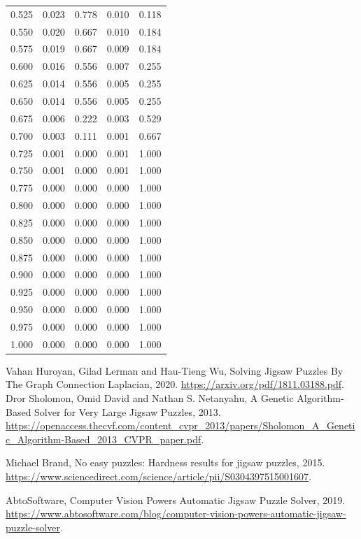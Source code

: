 \documentclass{article}
\begin{document}
\begin{table}[]
\begin{tabular}{
  >{\columncolor[HTML]{FFE599}}c 
  >{\columncolor[HTML]{B6D7A8}}c 
  >{\columncolor[HTML]{9FC5E8}}c 
  >{\columncolor[HTML]{F9CB9C}}c 
  >{\columncolor[HTML]{D9D2E9}}c }
  0.525 & 0.023 & 0.778 & 0.010 & 0.118 \\
  0.550 & 0.020 & 0.667 & 0.010 & 0.184 \\
  0.575 & 0.019 & 0.667 & 0.009 & 0.184 \\
  0.600 & 0.016 & 0.556 & 0.007 & 0.255 \\
  0.625 & 0.014 & 0.556 & 0.005 & 0.255 \\
  0.650 & 0.014 & 0.556 & 0.005 & 0.255 \\
  0.675 & 0.006 & 0.222 & 0.003 & 0.529 \\
  0.700 & 0.003 & 0.111 & 0.001 & 0.667 \\
  0.725 & 0.001 & 0.000 & 0.001 & 1.000 \\
  0.750 & 0.001 & 0.000 & 0.001 & 1.000 \\
  0.775 & 0.000 & 0.000 & 0.000 & 1.000 \\
  0.800 & 0.000 & 0.000 & 0.000 & 1.000 \\
  0.825 & 0.000 & 0.000 & 0.000 & 1.000 \\
  0.850 & 0.000 & 0.000 & 0.000 & 1.000 \\
  0.875 & 0.000 & 0.000 & 0.000 & 1.000 \\
  0.900 & 0.000 & 0.000 & 0.000 & 1.000 \\
  0.925 & 0.000 & 0.000 & 0.000 & 1.000 \\
  0.950 & 0.000 & 0.000 & 0.000 & 1.000 \\
  0.975 & 0.000 & 0.000 & 0.000 & 1.000 \\
  1.000 & 0.000 & 0.000 & 0.000 & 1.000
  \end{tabular}
  \end{table}

\centering


\clearpage
\begin{thebibliography}{9}

    Vahan Huroyan, Gilad   Lerman and Hau-Tieng Wu,
    Solving Jigsaw Puzzles By The Graph Connection Laplacian,
    2020.
    \url{https://arxiv.org/pdf/1811.03188.pdf}.
    Dror Sholomon, Omid David and Nathan S. Netanyahu,
    A Genetic Algorithm-Based Solver for Very Large Jigsaw Puzzles,
    2013.
    \url{https://openaccess.thecvf.com/content_cvpr_2013/papers/Sholomon_A_Genetic_Algorithm-Based_2013_CVPR_paper.pdf}.
  
    Michael Brand,
    No easy puzzles: Hardness results for jigsaw puzzles,
    2015.
    \url{https://www.sciencedirect.com/science/article/pii/S0304397515001607}.

    AbtoSoftware,
    Computer Vision Powers Automatic Jigsaw Puzzle Solver,
    2019.
    \url{https://www.abtosoftware.com/blog/computer-vision-powers-automatic-jigsaw-puzzle-solver}.
  
\end{thebibliography}
\end{document}
